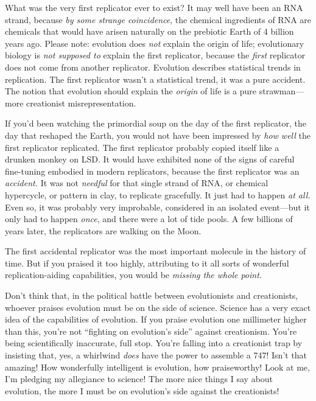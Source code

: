 {
 What was the very first replicator ever to exist? It may well have
been an RNA strand, because \textit{by some strange coincidence}, the
chemical ingredients of RNA are chemicals that would have arisen
naturally on the prebiotic Earth of 4 billion years ago. Please note:
evolution does \textit{not} explain the origin of life; evolutionary
biology is \textit{not supposed to} explain the first replicator,
because the \textit{first} replicator does not come from another
replicator. Evolution describes statistical trends in replication. The
first replicator wasn't a statistical trend, it was a
pure accident. The notion that evolution should explain the
\textit{origin} of life is a pure strawman---more creationist
misrepresentation.}

{
 If you'd been watching the primordial soup on the
day of the first replicator, the day that reshaped the Earth, you would
not have been impressed by \textit{how well} the first replicator
replicated. The first replicator probably copied itself like a drunken
monkey on LSD. It would have exhibited none of the signs of careful
fine-tuning embodied in modern replicators, because the first
replicator was an \textit{accident.} It was not \textit{needful} for
that single strand of RNA, or chemical hypercycle, or pattern in clay,
to replicate gracefully. It just had to happen \textit{at all.} Even
so, it was probably very improbable, considered in an isolated
event---but it only had to happen \textit{once}, and there were a lot
of tide pools. A few billions of years later, the replicators are
walking on the Moon.}

{
 The first accidental replicator was the most important molecule in
the history of time. But if you praised it too highly, attributing to
it all sorts of wonderful replication-aiding capabilities, you would be
\textit{missing the whole point.}}

{
 Don't think that, in the political battle between
evolutionists and creationists, whoever praises evolution must be on
the side of science. Science has a very exact idea of the capabilities
of evolution. If you praise evolution one millimeter higher than this,
you're not ``fighting on
evolution's side'' against
creationism. You're being scientifically inaccurate,
full stop. You're falling into a creationist trap by
insisting that, yes, a whirlwind \textit{does} have the power to
assemble a 747! Isn't that amazing! How wonderfully
intelligent is evolution, how praiseworthy! Look at me,
I'm pledging my allegiance to science! The more nice
things I say about evolution, the more I must be on
evolution's side against the creationists!}

